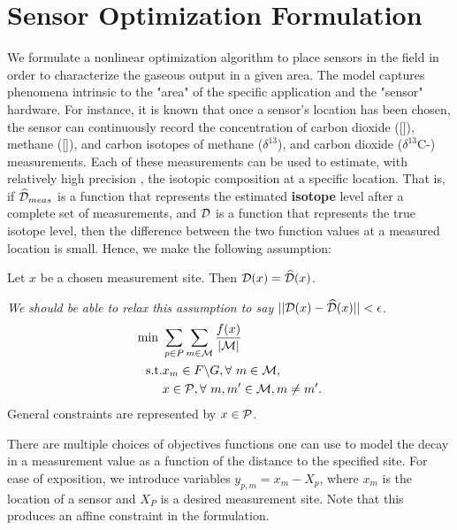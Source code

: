 \section{Sensor Optimization Formulation}

\noindent
We formulate a nonlinear optimization algorithm to place sensors in the field in order to characterize the gaseous output in a given area. The model captures phenomena intrinsic to the "area" of the specific application and the "sensor" hardware. For instance, it is known that once a sensor's location has been chosen, the sensor can continuously record the concentration of carbon dioxide ([]), methane ([]), and carbon isotopes of methane ($\delta^{13}$), and carbon dioxide ($\delta^{13}$C-) measurements. Each of these measurements can be used to estimate, with relatively high precision \citep{Christiansen2015}, the isotopic composition at a specific location. That is, if $\widehat{\mathcal{D}}_{meas}$ is a function that represents the estimated \textbf{isotope} level after a complete set of measurements, and $\mathcal{D}$ is a function that represents the true isotope level, then the difference between the two function values at a measured location is small. Hence, we make the following assumption:

\begin{MyAssum}
Let $x$ be a chosen measurement site. Then $\mathcal{D}(x) = \widehat{\mathcal{D}}(x)$.
\end{MyAssum}

\textit{We should be able to relax this assumption to say $||\mathcal{D}(x) - \widehat{\mathcal{D}}(x)|| < \epsilon$.}\\


\begin{subequations}\label{PreliminaryModel}
\begin{align}                                               
\min \ &\sum\limits_{p \in P}\sum\limits_{m \in \cM} \frac{f(x)}{|\cM|} \\
\text{s.t.} & x_{m} \in F \backslash G, \forall \ m \in \cM, \label{PM:gravelConstraint}\\
&x \in \cP, \forall \ m, m' \in \cM, m \neq m'. \label{PM:radiusConstraint}
\end{align}
\end{subequations}
General constraints are represented by $x \in \mathcal{P}$.

There are multiple choices of objectives functions one can use to model the decay in a measurement value as a function of the distance to the specified site. For ease of exposition, we introduce variables $y_{p,m} = x_{m} - X_{p}$, where $x_{m}$ is the location of a sensor and $X_{P}$ is a desired measurement site. Note that this produces an affine constraint in the formulation. 

